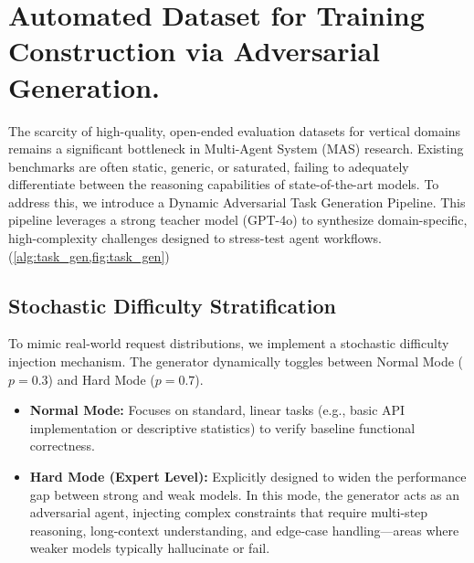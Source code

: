 \documentclass{article}
\theoremstyle{plain}
\theoremstyle{definition}
\theoremstyle{remark}
\begin{document}
\section{Automated Dataset for Training Construction via Adversarial Generation.}
\label{app:auto_dataset}
The scarcity of high-quality, open-ended evaluation datasets for vertical domains remains a significant bottleneck in Multi-Agent System (MAS) research. Existing benchmarks are often static, generic, or saturated, failing to adequately differentiate between the reasoning capabilities of state-of-the-art models. To address this, we introduce a Dynamic Adversarial Task Generation Pipeline. This pipeline leverages a strong teacher model (GPT-4o) to synthesize domain-specific, high-complexity challenges designed to stress-test agent workflows. (\cref{alg:task_gen,fig:task_gen})

\subsection{Stochastic Difficulty Stratification}
To mimic real-world request distributions, we implement a stochastic difficulty injection mechanism. The generator dynamically toggles between Normal Mode ($p=0.3$) and Hard Mode ($p=0.7$).
\begin{itemize}
\item \textbf{Normal Mode:} Focuses on standard, linear tasks (e.g., basic API implementation or descriptive statistics) to verify baseline functional correctness.
\item \textbf{Hard Mode (Expert Level):} Explicitly designed to widen the performance gap between strong and weak models. In this mode, the generator acts as an adversarial agent, injecting complex constraints that require multi-step reasoning, long-context understanding, and edge-case handling—areas where weaker models typically hallucinate or fail.
\end{itemize}
\end{document}
